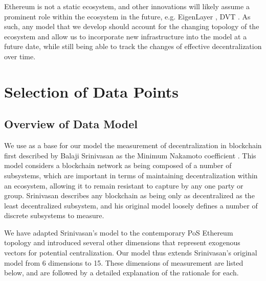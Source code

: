 \documentclass[conference]{IEEEtran}
\begin{document}
Ethereum is not a static ecosystem, and other innovations will likely assume a prominent role within the ecosystem in the future, e.g. EigenLayer \cite{eigenlayer2023}, DVT \cite{asgaonkar-2021}.  As such, any model that we develop should account for the changing topology of the ecosystem and allow us to incorporate new infrastructure into the model at a future date, while still being able to track the changes of effective decentralization over time.

\section{Selection of Data Points}

\subsection{Overview of Data Model}

We use as a base for our model the measurement of decentralization in blockchain first described by Balaji Srinivasan as the Minimum Nakamoto coefficient \cite{srinivasan2018}.  This model considers a blockchain network as being composed of a number of subsystems, which are important in terms of maintaining decentralization within an ecosystem, allowing it to remain resistant to capture by any one party or group.  Srinivasan describes any blockchain as being only as decentralized as the least decentralized subsystem, and his original model loosely defines a number of discrete subsystems to measure.

We have adapted Srinivasan's model to the contemporary PoS Ethereum topology and introduced several other dimensions that represent exogenous vectors for potential centralization.  Our model thus extends Srinivasan's original model from 6 dimensions to 15.  These dimensions of measurement are listed below, and are followed by a detailed explanation of the rationale for each.

\vspace{8pt}
\end{document}
